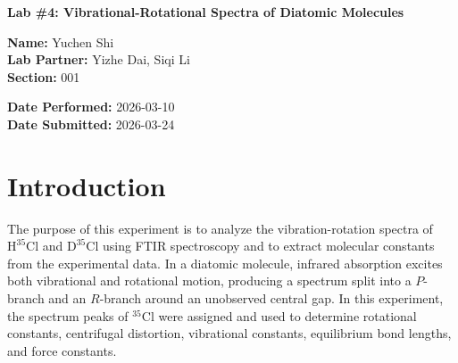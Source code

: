 \documentclass[12pt]{article}
\begin{document}
\begin{center}
    \Large \textbf{Lab \#4: Vibrational-Rotational Spectra of Diatomic Molecules}
\end{center}
\vspace{0.5em}
\noindent
\begin{minipage}[t]{0.5\textwidth}
    \small
    \textbf{Name:} Yuchen Shi \\
    \textbf{Lab Partner:} Yizhe Dai, Siqi Li \\ 
    \textbf{Section:} 001
\end{minipage}%
\begin{minipage}[t]{0.5\textwidth}
    \small \raggedleft
    \textbf{Date Performed:} 2026-03-10 \\ 
    \textbf{Date Submitted:} 2026-03-24  
\end{minipage}
\vspace{1.5em}

\begin{abstract}
\noindent
The rovibrational spectra of HCl and DCl were recorded with an FTIR spectrometer in advance and analyzed to obtain rotational, vibrational, and structural constants. Assigned P-branch and R-branch lines were used in linearized forms of the rovibrational equations to determine \(B_0\), \(B_1\), \(D_e\), and the band origin. The values were combined with literature overtones and higher-\(v\) rotational constants to obtain \(B_e\), \(\alpha_e\), \(\tilde{\nu}_0\), and \(\tilde{\nu}_0\chi_e\). The final results were \(B_e=10.58441 \pm 0.00225\) and \(5.44881\pm0.00067\ \mathrm{cm^{-1}}\) for H\(^{35}\)Cl and D\(^{35}\)Cl, respectively; \(r_e=1.27509\pm0.00014\) and \(1.27458\pm0.00008\ \text{Ang}\); and \(k=551.87366 \pm 0.06886\) and \(541.83065 \pm 0.03540\ \mathrm{N\,m^{-1}}\). The bond lengths agreed closely with literature values with overall errors below 0.05\%, while the force constants have slightly higher error rates of 5 to 7\%.
\end{abstract}


\section*{Introduction}

The purpose of this experiment is to analyze the vibration-rotation spectra of \(\mathrm{H}^{35}\mathrm{Cl}\) and \(\mathrm{D}^{35}\mathrm{Cl}\) using FTIR spectroscopy and to extract molecular constants from the experimental data. In a diatomic molecule, infrared absorption excites both vibrational and rotational motion, producing a spectrum split into a \(P\)-branch and an \(R\)-branch around an unobserved central gap. In this experiment, the spectrum peaks of \({}^{35}\mathrm{Cl}\) were assigned and used to determine rotational constants, centrifugal distortion, vibrational constants, equilibrium bond lengths, and force constants.
\end{document}
